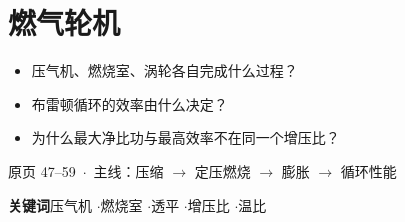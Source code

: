 \section{燃气轮机}

\begin{frame}[t,shrink]{}
{\begin{itemize}
  \item 压气机、燃烧室、涡轮各自完成什么过程？
  \item 布雷顿循环的效率由什么决定？
  \item 为什么最大净比功与最高效率不在同一个增压比？
\end{itemize}}
{原页 47--59 \,$\cdot$\, 主线：压缩 $\rightarrow$ 定压燃烧 $\rightarrow$ 膨胀 $\rightarrow$ 循环性能}
\vspace{3mm}
\begin{center}
\small
\textbf{关键词}\quad 压气机 \enspace$\cdot$\enspace 燃烧室 \enspace$\cdot$\enspace 透平 \enspace$\cdot$\enspace 增压比 \enspace$\cdot$\enspace 温比
\end{center}
\end{frame}

